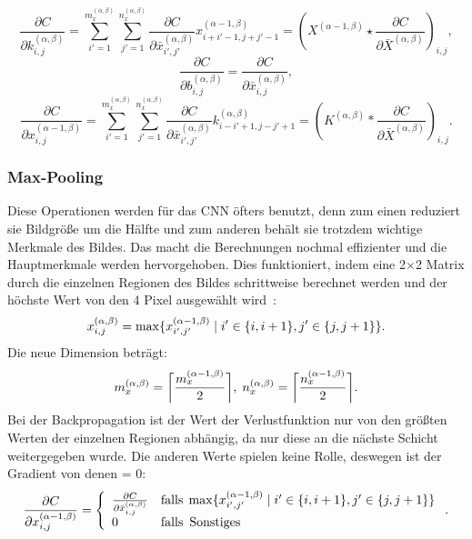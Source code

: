 \documentclass[11pt]{article}
\begin{document}
\begin{equation}
    \frac{\partial C}{\partial k_{i,j}^{(\alpha,\beta)}} = \sum_{i'=1}^{m_x^{(\alpha,\beta)}}\sum_{j'=1}^{n_x^{(\alpha,\beta)}} \frac{\partial C}{\partial \bar{x}_{i',j'}^{(\alpha,\beta)}}
    x_{i+i'-1,j+j'-1}^{(\alpha-1,\beta)} = {(X^{(\alpha-1,\beta)} \star \frac{\partial C}{\partial \bar{X}^{(\alpha,\beta)}})}_{i,j},
\end{equation}
\begin{equation}
    \frac{\partial C}{\partial b_{i,j}^{(\alpha,\beta)}} = \frac{\partial C}{\partial \bar{x}_{i,j}^{(\alpha,\beta)}},
\end{equation}
\begin{equation}
    \frac{\partial C}{\partial x_{i,j}^{(\alpha-1,\beta)}} = \sum_{i'=1}^{m_x^{(\alpha,\beta)}}\sum_{j'=1}^{n_x^{(\alpha,\beta)}} \frac{\partial C}{\partial \bar{x}_{i',j'}^{(\alpha,\beta)}} k_{i-i'+1,j-j'+1}^{(\alpha,\beta)}
    = {(K^{(\alpha,\beta)} \ast \frac{\partial C}{\partial \bar{X}^{(\alpha,\beta)}})}_{i,j}.
\end{equation}

\subsubsection{Max-Pooling}
Diese Operationen werden für das CNN öfters benutzt, denn zum einen reduziert sie Bildgröße um die Hälfte und zum anderen behält sie trotzdem wichtige
Merkmale des Bildes. Das macht die Berechnungen nochmal effizienter und die Hauptmerkmale werden hervorgehoben. Dies funktioniert, indem eine 2$\times$2 Matrix
durch die einzelnen Regionen des Bildes schrittweise berechnet werden und der höchste Wert von den 4 Pixel ausgewählt wird~\cite{17}:
\begin{equation}
    x_{i,j}^{(\alpha,\beta)} = \max\{x_{i',j'}^{(\alpha-1,\beta)} \mkern5mu | \mkern5mu i' \in \{i,i+1\}, j' \in \{j,j+1\} \}.
\end{equation}
Die neue Dimension beträgt:
\begin{equation}
    m_{x}^{(\alpha,\beta)} = \bigg\lceil \frac{m_{x}^{(\alpha-1,\beta)}}{2} \bigg\rceil, \mkern5mu
    n_{x}^{(\alpha,\beta)} = \bigg\lceil \frac{n_{x}^{(\alpha-1,\beta)}}{2} \bigg\rceil.
\end{equation}
Bei der Backpropagation ist der Wert der Verlustfunktion nur von den größten Werten der einzelnen Regionen abhängig, da nur diese an die nächste Schicht weitergegeben wurde.
Die anderen Werte spielen keine Rolle, deswegen ist der Gradient von denen = 0:
\begin{equation}
    \frac{\partial C}{\partial x_{i,j}^{(\alpha-1,\beta)}} =
    \left\{
    \begin{array}{ll}
		\frac{\partial C}{\partial \bar{x}_{i,j}^{(\alpha,\beta)}} & \mathrm{falls} \mkern5mu \max\{x_{i',j'}^{(\alpha-1,\beta)} \mkern5mu | \mkern5mu i' \in \{i,i+1\}, j' \in \{j,j+1\} \} \\
		0 & \mathrm{falls} \mkern9mu \mathrm{Sonstiges}
	\end{array}
    \right..
\end{equation}
\end{document}
